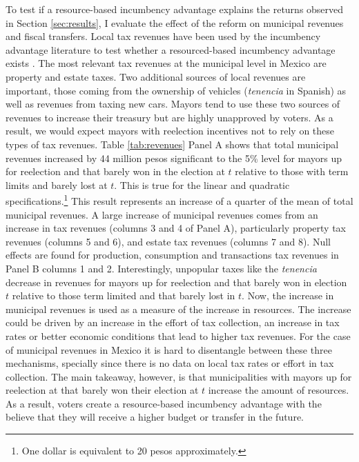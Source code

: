 To test if a resource-based incumbency advantage explains the returns observed in Section \ref{sec:results}, I evaluate the effect of the reform on municipal revenues and fiscal transfers. Local tax revenues have been used by the incumbency advantage literature to test whether a resourced-based incumbency advantage exists \citep{fiorina_1989, cox_morgensten_1993}. The most relevant tax revenues at the municipal level in Mexico are property and estate taxes. Two additional sources of local revenues are important, those coming from the ownership of vehicles (\emph{tenencia} in Spanish) as well as revenues from taxing new cars. Mayors tend to use these two sources of revenues to increase their treasury but are highly unapproved by voters. As a result, we would expect mayors with reelection incentives not to rely on these types of tax revenues. Table \ref{tab:revenues} Panel A shows that total municipal revenues increased by 44 million pesos significant to the 5\% level for mayors up for reelection and that barely won in the election at $t$ relative to those with term limits and barely lost at $t$.  This is true for the linear and quadratic specifications.\footnote{One dollar is equivalent to 20 pesos approximately.} This result represents an increase of a quarter of the mean of total municipal revenues. A large increase of municipal revenues comes from an increase in tax revenues (columns 3 and 4 of Panel A), particularly property tax revenues (columns 5 and 6), and estate tax revenues (columns 7 and 8). Null effects are found for production, consumption and transactions tax revenues in Panel B columns 1 and 2. Interestingly, unpopular taxes like the \emph{tenencia} decrease in revenues for mayors up for reelection and that barely won in election $t$ relative to those term limited and that barely lost in $t$. Now, the increase in municipal revenues is used as a measure of the increase in resources. The increase could be driven by an increase in the effort of tax collection, an increase in tax rates or better economic conditions that lead to higher tax revenues. For the case of municipal revenues in Mexico it is hard to disentangle between these three mechanisms, specially since there is no data on local tax rates or effort in tax collection. The main takeaway, however, is that municipalities with mayors up for reelection at that barely won their election at $t$ increase the amount of resources. As a result, voters create a resource-based incumbency advantage with the believe that they will receive a higher budget or transfer in the future. %


